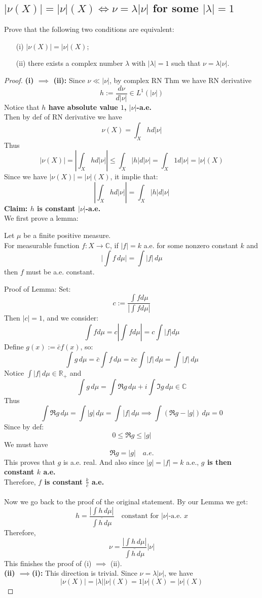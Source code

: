 \documentclass[lang=cn,11pt]{elegantbook}
\begin{document}
\subsection{$|\nu(X)|=|\nu|(X) \iff \nu=\lambda|\nu|$ for some $|\lambda| =1$ }
Prove that the following two conditions are equivalent: 
\begin{itemize}
    \item[(i)]      $|\nu(X)|=|\nu|(X)$; 
    \item[(ii)]      there exists a complex number $\lambda$ with $|\lambda|=1$ such that $\nu=\lambda|\nu|$. 
\end{itemize}
\begin{proof}
\textbf{(i) $\implies$ (ii):} Since $\nu \ll |\nu|$, by complex RN Thm we have RN derivative  $$h:=\frac{d \nu}{d|\nu|} \in L^1(|\nu|)$$
Notice that\textbf{ $h$ have absolute value $1$, $|\nu|$-a.e.}\\
Then by def of RN derivative we have \[\nu(X)=\int_X h d|\nu| \]
Thus
$$|\nu(X)|=\left|\int_X h d | \nu| \right| \leq \int_X|h| d|\nu|=\int_X 1 d|\nu|=|\nu|(X)$$
Since we have $|\nu(X)|=|\nu|(X)$, it implie that: \[
\left|\int_X h d | \nu| \right| = \int_X|h| d|\nu|
\]
\textbf{Claim: $h$ is constant $|\nu|$-a.e.}\\
We first prove a lemma:
\begin{lemma}
   Let $\mu$ be a finite positive measure.\\
   For measurable function $f: X \to\mathbb{C}$, if $|f| = k$ a.e. for some nonzero constant $k$ and     \[
\bigg| \int f  \, d\mu \bigg|  = \int |f| \, d\mu 
\]
then $f$ must be a.e. constant. 
\end{lemma}
Proof of Lemma: 
Set:$$
c:=\frac{\int f d \mu}{\left|\int f d \mu\right|}
$$Then $|c|=1$, and we consider:
$$
\int f d \mu= c \left|\int f d \mu\right| = c \int|f| d \mu
$$
Define $g(x):=\bar{c} f(x)$, so:
$$
\int g \,d \mu=\bar{c} \int f \,d \mu=\bar{c} c \int|f|\, d \mu=\int|f| \,d \mu
$$
Notice $\int|f| \,d \mu \in \mathbb{R}_+$ and \[
\int g \,d \mu = \int \Re g \, d\mu  + i \int \Im g \, d\mu \in \mathbb{C}
\]Thus $$
\int\Re g  \,d \mu =  \int|g|\, d \mu =  \int|f|\, d \mu \implies \int (\Re g - |g|) \, d\mu = 0
$$
Since by def:$$
0 \leq \Re g \leq|g| 
$$
We must have\[
\Re g =  |g|\quad a.e.
\]
This proves that $g$ is a.e. real. And also since $|g|  = |f| = k$ a.e., \textbf{$g$ is then constant $k$ a.e.}\\
Therefore, \textbf{$f$ is constant $\frac{k}{\bar{c} }$ a.e.}\\\\
Now we go back to the proof of the original statement. By our Lemma we get: \[
h = \frac{\left|\int h\, d \mu\right|}{\overline{\int h\, d \mu}}\quad \text{constant for $|\nu|$-a.e. } x
\]
Therefore, \[
\nu=\frac{\left|\int h\, d \mu\right|}{\overline{\int h\, d \mu}}|\nu|
\]
This finishes the proof of (i) $\implies$ (ii).\\
\textbf{(ii) $\implies$(i): } This direction is trivial. Since $\nu=\lambda|\nu|$, we have \[
|\nu(X)| = |\lambda|  |\nu|(X)  = 1 |\nu|(X)    = |\nu|(X)  
\]
\end{proof}
\end{document}

